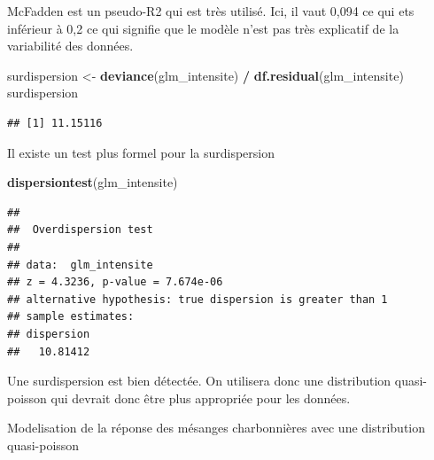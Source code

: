 \documentclass[
  french,
]{article}
\newenvironment{Shaded}{\begin{snugshade}}{\end{snugshade}}
\newcommand{\CommentTok}[1]{\textcolor[rgb]{0.56,0.35,0.01}{\textit{#1}}}
\newcommand{\ControlFlowTok}[1]{\textcolor[rgb]{0.13,0.29,0.53}{\textbf{#1}}}
\newcommand{\DecValTok}[1]{\textcolor[rgb]{0.00,0.00,0.81}{#1}}
\newcommand{\FunctionTok}[1]{\textcolor[rgb]{0.13,0.29,0.53}{\textbf{#1}}}
\newcommand{\NormalTok}[1]{#1}
\newcommand{\OtherTok}[1]{\textcolor[rgb]{0.56,0.35,0.01}{#1}}
\newcommand{\SpecialCharTok}[1]{\textcolor[rgb]{0.81,0.36,0.00}{\textbf{#1}}}
\begin{document}
McFadden est un pseudo-R2 qui est très utilisé. Ici, il vaut 0,094 ce
qui ets inférieur à 0,2 ce qui signifie que le modèle n'est pas très
explicatif de la variabilité des données.

\begin{Shaded}
\begin{Highlighting}[]
\NormalTok{surdispersion }\OtherTok{\textless{}{-}} \FunctionTok{deviance}\NormalTok{(glm\_intensite) }\SpecialCharTok{/} \FunctionTok{df.residual}\NormalTok{(glm\_intensite)}
\NormalTok{surdispersion}
\end{Highlighting}
\end{Shaded}

\begin{verbatim}
## [1] 11.15116
\end{verbatim}

Il existe un test plus formel pour la surdispersion

\begin{Shaded}
\begin{Highlighting}[]
\FunctionTok{dispersiontest}\NormalTok{(glm\_intensite)}
\end{Highlighting}
\end{Shaded}

\begin{verbatim}
## 
##  Overdispersion test
## 
## data:  glm_intensite
## z = 4.3236, p-value = 7.674e-06
## alternative hypothesis: true dispersion is greater than 1
## sample estimates:
## dispersion 
##   10.81412
\end{verbatim}

Une surdispersion est bien détectée. On utilisera donc une distribution
quasi-poisson qui devrait donc être plus appropriée pour les données.

Modelisation de la réponse des mésanges charbonnières avec une
distribution quasi-poisson

\begin{Shaded}
\end{Shaded}
\end{document}
